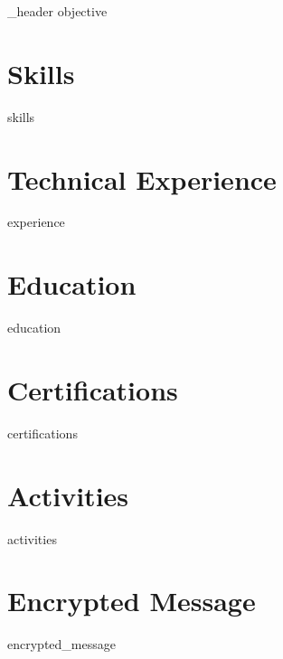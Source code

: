 \documentclass[letter,10pt]{article}
\author{Takasur Azeem} %
\begin{document}
{_header}
{objective}

\section{Skills}
{skills}

\section{Technical Experience}
{experience}

\section{Education}
{education}

\section{Certifications}
{certifications}


\section{Activities}
{activities}

\section{Encrypted Message}
{encrypted_message}
\end{document}
